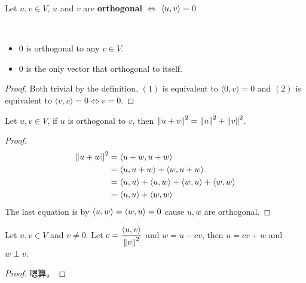 \documentclass[../main.tex]{subfiles}
\begin{document}
\setcounter{definition}{9}
\begin{definition}
  Let $u, v \in V$, $u$ and $v$ are \textbf{orthogonal} $\iff$ $\langle u , v\rangle = 0$
\end{definition}

\setcounter{theorem}{10}
\begin{theorem}
  ~
  \begin{itemize}
    \item $0$ is orthogonal to any $v \in V$.
    \item $0$ is the only vector that orthogonal to itself.
  \end{itemize}
\end{theorem}
\begin{proof}
  Both trivial by the definition, $(1)$ is equivalent to $\langle 0, v \rangle = 0$ and
  $(2)$ is equivalent to $\langle v, v \rangle = 0 \iff v = 0$.
\end{proof}

\begin{theorem}[勾股定理]
  Let $u, v \in V$, if $u$ is orthogonal to $v$, then
  $\left\Vert u + v \right\Vert^2 = \left\Vert u \right\Vert^2 + \left\Vert v \right\Vert^2$.
\end{theorem}
\begin{proof}
  \begin{align*}
    \left\Vert u + w \right\Vert^2 &= \langle u + w , u + w\rangle \\
    &= \langle u , u + w\rangle + \langle w , u + w\rangle \\
    &= \langle u , u\rangle + \langle u , w\rangle + \langle w , u\rangle + \langle w , w\rangle \\
    &= \langle u , u\rangle + \langle w , w\rangle
  \end{align*}
  The last equation is by $\langle u , w\rangle = \langle w , u\rangle = 0$ cause $u, w$ are orthogonal.
\end{proof}

\begin{theorem}\label{T6.13}
  Let $u, v \in V$ and $v \neq 0$. Let $c = \displaystyle \frac{\langle u , v\rangle}{\left\Vert v \right\Vert^2}$
  and $w = u - cv$, then $u = cv + w$ and $w \perp v$.
\end{theorem}
\begin{proof}
  嗯算。
\end{proof}
\end{document}
